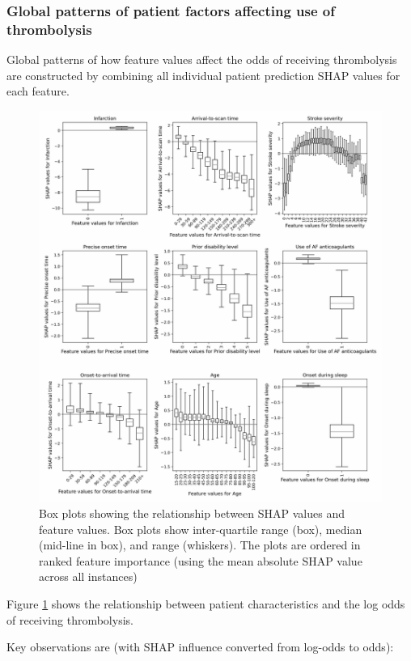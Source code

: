 \subsubsection{Global patterns of patient factors affecting use of thrombolysis}

Global patterns of how feature values affect the odds of receiving thrombolysis are constructed by combining all individual patient prediction SHAP values for each feature.


\begin{figure}
    \centering
    \includegraphics[width=1\linewidth]{images/p2_patient_shap.jpg}
    \caption{Box plots showing the relationship between SHAP values and feature values. Box plots show inter-quartile range (box), median (mid-line in box), and range (whiskers). The plots are ordered in ranked feature importance (using the mean absolute SHAP value across all instances)}
    \label{fig:global_shap}
\end{figure}


Figure \ref{fig:global_shap} shows the relationship between patient characteristics and the log odds of receiving thrombolysis.

Key observations are (with SHAP influence converted from log-odds to odds):


